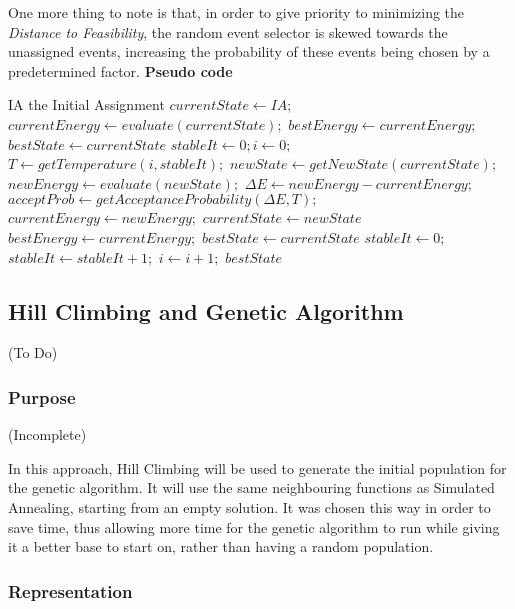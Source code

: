 \documentclass{llncs}
\begin{document}
One more thing to note is that, in order to give priority to minimizing the \textit{Distance to Feasibility}, the random event selector is skewed towards the unassigned events, increasing the probability of these events being chosen by a predetermined factor.
\newpage
\textbf{Pseudo code}
\begin{algorithmic}[1]
\Require IA the Initial Assignment
\State $currentState \leftarrow  IA;$
\State $currentEnergy \leftarrow  evaluate(currentState);$
\State $bestEnergy \gets currentEnergy;$
\State $bestState \gets currentState$
\State $stableIt \gets 0; i \gets 0;$
	\State $T \leftarrow getTemperature(i,stableIt);$
	\State $newState \leftarrow  getNewState(currentState);$
	\State $newEnergy \gets evaluate(newState);$
	\State $\Delta E \gets newEnergy - currentEnergy;$
	\State $acceptProb \gets getAcceptanceProbability(\Delta E,T);$
			\State $currentEnergy  \gets newEnergy;$
			\State $currentState \gets newState$
	\EndIf
			\State $ bestEnergy \gets currentEnergy ;$
			\State $ bestState\gets currentState$
			\State $stableIt \gets 0;$
	\Else
		\State $stableIt \gets stableIt +1;$
	\EndIf
	\State $i \gets i +1;$
\EndWhile
\State \Return $bestState$	
	


\end{algorithmic}


\subsection{Hill Climbing and Genetic Algorithm}
(To Do)



\subsubsection{Purpose}
(Incomplete)

In this approach, Hill Climbing will be used to generate the initial population for the genetic algorithm.
It will use the same neighbouring functions as Simulated Annealing, starting from an empty solution. It was chosen this way in order to save time, thus allowing more time for the genetic algorithm to run while giving it a better base to start on, rather than having a random population.

\subsubsection{Representation}
\end{document}
